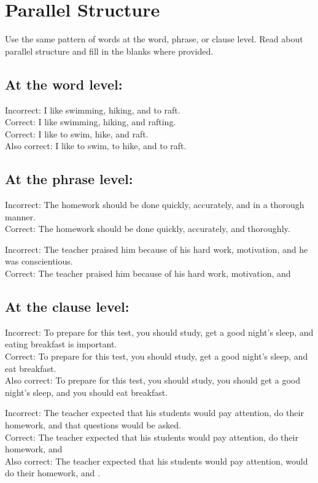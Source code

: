\documentclass[12pt]{book}
\newcommand{\longline}{\underline{\hspace{2in}} }
\begin{document}
\section{Parallel Structure}
Use the same pattern of words at the word, phrase, or clause level. Read about parallel structure and fill in the blanks where provided.

\subsection{At the word level:}
Incorrect: I like swimming, hiking, and to raft.\\
Correct: I like swimming, hiking, and rafting.\\
Correct:  I like to swim, hike, and raft.\\
Also correct:  I like to swim, to hike, and to raft.

\subsection{At the phrase level:}
Incorrect:  The homework should be done quickly, accurately, and in a thorough manner.\\
Correct: The homework should be done quickly, accurately, and thoroughly.

\bigskip
Incorrect:  The teacher praised him because of his hard work, motivation, and he was conscientious.\\
Correct: The teacher praised him because of his hard work, motivation, and
\longline   %

\subsection{At the clause level:}
Incorrect: To prepare for this test, you should study, get a good night's sleep, and eating breakfast is important. \\
Correct: To prepare for this test, you should study, get a good night's sleep, and eat breakfast.\\
Also correct:  To prepare for this test, you should study, you should get a good night's sleep, and you should eat breakfast.

\bigskip
Incorrect:  The teacher expected that his students would pay attention, do their homework, and that questions would be asked.\\
Correct:  The teacher expected that his students would pay attention, do their homework, and \hrulefill \\
Also correct:  The teacher expected that his students would pay attention, would do their homework, and \hrulefill.
\end{document}
